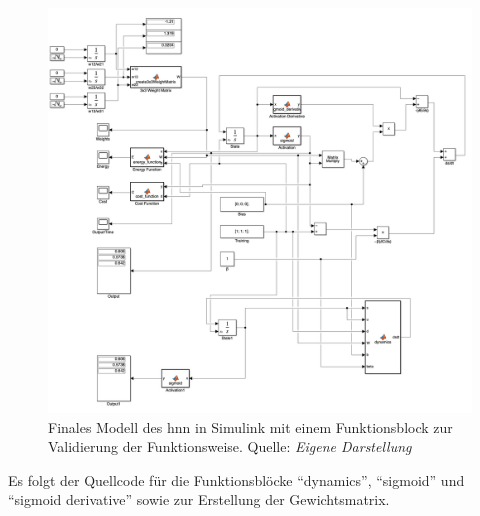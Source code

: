 \begin{figure}[h]
  \includegraphics[width=\textwidth]{abbildungen/hnn_with_proof_simulink.png}
  \caption{Finales Modell des \ac{hnn} in Simulink mit einem Funktionsblock zur Validierung der Funktionsweise. Quelle: \textit{Eigene Darstellung}}
  \label{fig:Hopfield-Netzwerk Final Simulink}
\end{figure}

Es folgt der Quellcode für die Funktionsblöcke "`dynamics"', "`sigmoid"' und "`sigmoid derivative"' sowie zur Erstellung der Gewichtsmatrix.





